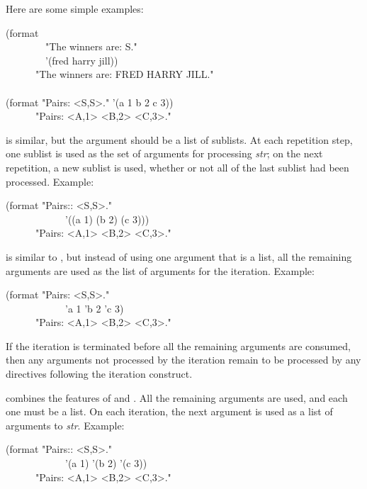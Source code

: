 \begin{flushdesc}
Here are some simple examples:
\begin{lisp}
(format {\false} \\
~~~~~~~~"The winners are:{\Xtilde}{\Xlbrace} {\Xtilde}S{\Xtilde}{\Xrbrace}." \\
~~~~~~~~'(fred harry jill)) \\
~~~~~\EV\ "The winners are: FRED HARRY JILL." \\
\\
(format {\false} "Pairs:{\Xtilde}{\Xlbrace} <{\Xtilde}S,{\Xtilde}S>{\Xtilde}{\Xrbrace}." '(a 1 b 2 c 3)) \\
~~~~~\EV\ "Pairs: <A,1> <B,2> <C,3>."
\end{lisp}

 is similar, but the argument should be a list of sublists.
At each repetition step, one sublist is used as the set of arguments for
processing \emph{str}; on the next repetition, a new sublist is used, whether
or not all of the last sublist had been processed.  Example:
\begin{lisp}
(format {\false} "Pairs:{\Xtilde}:{\Xlbrace} <{\Xtilde}S,{\Xtilde}S>{\Xtilde}{\Xrbrace}." \\
~~~~~~~~~~~~'((a 1) (b 2) (c 3))) \\
~~~~~\EV\ "Pairs: <A,1> <B,2> <C,3>."
\end{lisp}

 is similar to , but instead of
using one argument that is a list, all the remaining arguments
are used as the list of arguments for the iteration.
Example:
\begin{lisp}
(format {\false} "Pairs:{\Xtilde}{\Xatsign}{\Xlbrace} <{\Xtilde}S,{\Xtilde}S>{\Xtilde}{\Xrbrace}." \\
~~~~~~~~~~~~'a 1 'b 2 'c 3) \\
~~~~~\EV\ "Pairs: <A,1> <B,2> <C,3>."
\end{lisp}
If the iteration is terminated before all the remaining arguments are
consumed, then any arguments not processed by the iteration remain to be
processed by any directives following the iteration construct.

combines the features of 
and .
All the remaining arguments
are used, and each one must be a list.
On each iteration, the next argument is used as a list of arguments to \emph{str}.
Example:
\begin{lisp}
(format {\false} "Pairs:{\Xtilde}:{\Xatsign}{\Xlbrace} <{\Xtilde}S,{\Xtilde}S>{\Xtilde}{\Xrbrace}." \\
~~~~~~~~~~~~'(a 1) '(b 2) '(c 3)) \\
~~~~~\EV\ "Pairs: <A,1> <B,2> <C,3>."
\end{lisp}


\end{flushdesc}
